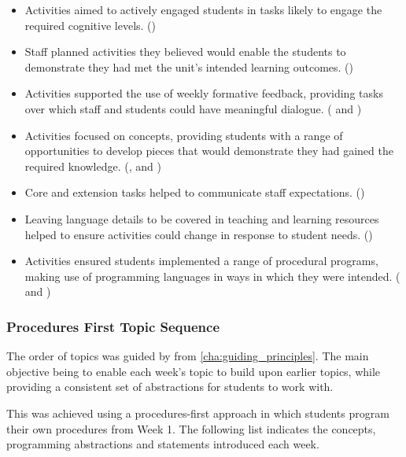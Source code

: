 \begin{itemize}[noitemsep,nolistsep]
	\item Activities aimed to actively engaged students in tasks likely to engage the required cognitive levels. ()
	\item Staff planned activities they believed would enable the students to demonstrate they had met the unit's intended learning outcomes. () 
	\item Activities supported the use of weekly formative feedback, providing tasks over which staff and students could have meaningful dialogue. ( and )
	\item Activities focused on concepts, providing students with a range of opportunities to develop pieces that would demonstrate they had gained the required knowledge. (,  and )
	\item Core and extension tasks helped to communicate staff expectations. ()
	\item Leaving language details to be covered in teaching and learning resources helped to ensure activities could change in response to student needs. ()
	\item Activities ensured students implemented a range of procedural programs, making use of programming languages in ways in which they were intended. ( and )
\end{itemize}

\clearpage
\subsubsection{Procedures First Topic Sequence} %
\label{ssub:procedures_first_topic_sequence}

The order of topics was guided by  from \cref{cha:guiding_principles}. The main objective being to enable each week's topic to build upon earlier topics, while providing a consistent set of abstractions for students to work with.

This was achieved using a procedures-first approach in which students program their own procedures from Week 1. The following list indicates the concepts, programming abstractions and statements introduced each week.

